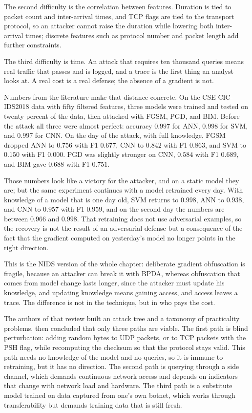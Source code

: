 The second difficulty is the correlation between features. Duration is tied to packet count and
inter-arrival times, and TCP flags are tied to the transport protocol, so an
attacker cannot raise the duration while lowering both inter-arrival times;
discrete features such as protocol number and packet length add further constraints.

The third difficulty is time. An attack that requires ten thousand queries means real
traffic that passes and is logged, and a trace is the first thing an analyst looks at.
A real cost is a real defense; the absence of a gradient is not.

Numbers from the literature make that distance concrete. On the CSE-CIC-IDS2018 data with fifty
filtered features, three models were trained and tested on twenty percent of the data, then
attacked with FGSM, PGD, and BIM. Before the attack all three were almost perfect: accuracy
$0.997$ for ANN, $0.998$ for SVM, and $0.997$ for CNN. On the day of the attack,
with full knowledge, FGSM dropped ANN to $0.756$ with F1 $0.677$, CNN to
$0.842$ with F1 $0.863$, and SVM to $0.150$ with F1 $0.000$. PGD was slightly
stronger on CNN, $0.584$ with F1 $0.689$, and BIM gave $0.688$ with F1
$0.751$.

Those numbers look like a victory for the attacker, and on a static model they are;
but the same experiment continues with a model retrained every day.
With knowledge of a model that is one day old, SVM returns to $0.998$, ANN to
$0.938$, and CNN to $0.957$ with F1 $0.959$, and on the second day the numbers are between
$0.966$ and $0.998$. That retraining does not use adversarial examples, so
the recovery is not the result of an adversarial defense but a consequence of the fact that the
gradient computed on yesterday's model no longer points in the right direction.

This is the NIDS version of the whole chapter: deliberate gradient obfuscation is fragile, because
an attacker can break it with BPDA, whereas obfuscation that comes from model change lasts longer,
since the attacker must update his knowledge, and updating knowledge means gaining access, and
access leaves a trace. The difference is not in the technique, but in who pays the cost.

The authors of that review built an attack tree and a taxonomy of practicality problems, then
concluded that only three paths are viable. The first path is blind perturbation:
adding random bytes to UDP packets, or to TCP packets with the PSH flag, while
recomputing the checksum so that the protocol stays valid. This path needs no knowledge of the
model and no queries, so it is immune to retraining, but it has no
direction. The second path is querying through a side channel, which demands continuous network
access and depends on indicators that change with network load and
hardware. The third path is a substitute model trained on data captured from one's own
botnet, which works through transferability but demands training data that is still
fresh.


